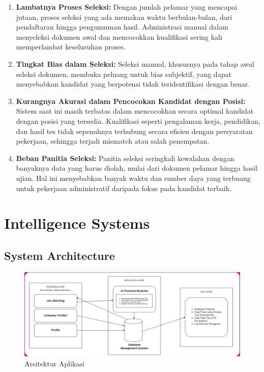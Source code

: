 \documentclass[journal,article,submit,pdftex,moreauthors]{Definitions/mdpi}
\begin{document}
\begin{enumerate}[left=2em]
    \item \textbf{Lambatnya Proses Seleksi:} Dengan jumlah pelamar yang mencapai jutaan, proses seleksi yang ada memakan waktu berbulan-bulan, dari pendaftaran hingga pengumuman hasil. Administrasi manual dalam menyeleksi dokumen awal dan mencocokkan kualifikasi sering kali memperlambat keseluruhan proses.
    
    \item \textbf{Tingkat Bias dalam Seleksi:} Seleksi manual, khususnya pada tahap awal seleksi dokumen, membuka peluang untuk bias subjektif, yang dapat menyebabkan kandidat yang berpotensi tidak teridentifikasi dengan benar.
    
    \item \textbf{Kurangnya Akurasi dalam Pencocokan Kandidat dengan Posisi:} Sistem saat ini masih terbatas dalam mencocokkan secara optimal kandidat dengan posisi yang tersedia. Kualifikasi seperti pengalaman kerja, pendidikan, dan hasil tes tidak sepenuhnya terhubung secara efisien dengan persyaratan pekerjaan, sehingga terjadi mismatch atau salah penempatan.
    
    \item \textbf{Beban Panitia Seleksi:} Panitia seleksi seringkali kewalahan dengan banyaknya data yang harus diolah, mulai dari dokumen pelamar hingga hasil ujian. Hal ini menyebabkan banyak waktu dan sumber daya yang terbuang untuk pekerjaan administratif daripada fokus pada kandidat terbaik.
\end{enumerate}

\section{Intelligence Systems}
\subsection{System Architecture}
\begin{figure}[H]
    \centering
    \includegraphics[width=1\textwidth]{image/arsitektur.png}
    \captionsetup{justification=centering}
    \caption{Arsitektur Aplikasi}
    \label{fig:enter-label}
\end{figure}
\end{document}
